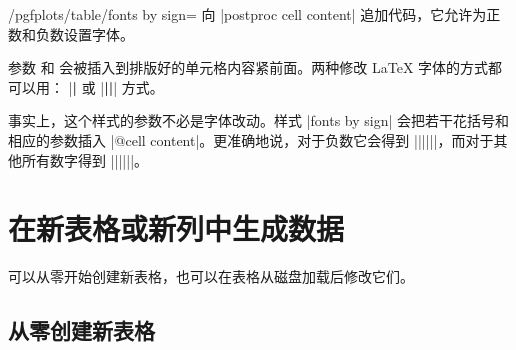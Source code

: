\documentclass[a4paper,doc2]{ltxdoc}
\begin{document}
\begin{stylekey}{/pgfplots/table/fonts by sign=}
    向 |postproc cell content| 追加代码，它允许为正数和负数设置字体。

    参数  和 
    会被插入到排版好的单元格内容紧前面。两种修改 \LaTeX{} 字体的方式都可以用：
    |\textbf| 或 |{\bfseries ||}| 方式。

\begin{codeexample}[]

%

\end{codeexample}
    事实上，这个样式的参数不必是字体改动。样式 |fonts by sign| 会把若干花括号和
    相应的参数插入 |@cell content|。更准确地说，对于负数它会得到
    |{||{||}}|，而对于其他所有数字得到
    |{||{||}}|。
\end{stylekey}


\section{在新表格或新列中生成数据}
\label{pgfplotstable:createcol}

可以从零开始创建新表格，也可以在表格从磁盘加载后修改它们。


\subsection{从零创建新表格}
\end{document}
